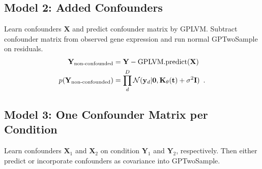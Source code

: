 \documentclass[a4paper,tablecaptionabove]{article}
\newcommand{\matr}[1]{\ensuremath{\mathbf{#1}}}
\begin{document}
\subsection{Model 2: Added Confounders}
\label{sec:model-2:-added}

Learn confounders $\matr X$ and predict confounder matrix by
GPLVM. Subtract confounder matrix from observed gene expression and
run normal GPTwoSample on residuals.
\begin{align}
  \label{eq:3}
  \matr Y_{\text{non-confounded}} &= \matr Y - \text{GPLVM.predict(\matr X)}\\
  p(\matr Y_{\text{non-confounded}}) &= \prod_d^D\mathcal N(\matr
  y_d|\matr 0, \matr K_{\matr\theta}(\matr t) + \sigma^2\matr
  I)\enspace.
\end{align}

\subsection{Model 3: One Confounder Matrix per Condition}
\label{sec:model-3:-one}

Learn confounders $\matr X_1$ and $\matr X_2$ on condition $\matr Y_1$
and $\matr Y_2$, respectively. Then either predict or incorporate
confounders as covariance into GPTwoSample.



\end{document}
